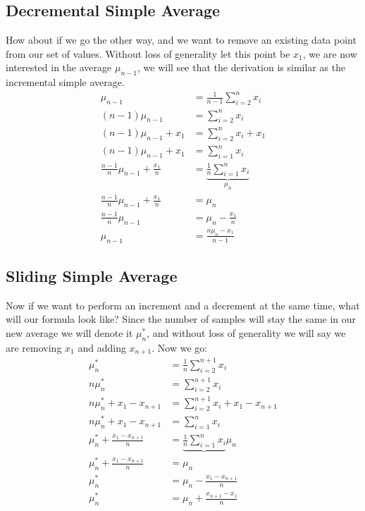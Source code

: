 \documentclass[english,12pt]{article}
\theoremstyle{plain}
\theoremstyle{definition}
\theoremstyle{definition} %
\begin{document}
\subsection{Decremental Simple Average}
How about if we go the other way, and we want to remove an existing data point from our set of values.  Without loss of generality let this point be $x_1$, we are now interested in the average $\mu_{n-1}$, we will see that the derivation is similar as the incremental simple average.  
\begin{align*}
\mu_{n-1} &= \frac{1}{n-1}\sum_{i=2}^{n}x_i\\
(n-1)\mu_{n-1} &= \sum_{i=2}^{n}x_i\\
(n-1)\mu_{n-1} + x_1 &= \sum_{i=2}^{n}x_i + x_1\\
(n-1)\mu_{n-1} + x_1 &= \sum_{i=1}^{n}x_i\\
\frac{n-1}{n}\mu_{n-1} + \frac{x_1}{n} &= \underbrace{\frac{1}{n}\sum_{i=1}^nx_i}_{\mu_n}\\
\frac{n-1}{n}\mu_{n-1} + \frac{x_1}{n} &= \mu_n\\
\frac{n-1}{n}\mu_{n-1} &= \mu_n - \frac{x_1}{n}\\
\mu_{n-1} &= \frac{n\mu_n - x_1}{n-1}
\end{align*}

\subsection{Sliding Simple Average}
Now if we want to perform an increment and a decrement at the same time, what will our formula look like?  Since the number of samples will stay the same in our new average we will denote it $\mu_{n}^\ast$, and without loss of generality we will say we are removing $x_1$ and adding $x_{n+1}$.  Now we go:
\begin{align*}
\mu_{n}^\ast &= \frac{1}{n} \sum_{i=2}^{n+1} x_i\\
n\mu_{n}^\ast &= \sum_{i=2}^{n+1} x_i\\
n\mu_{n}^\ast + x_1 - x_{n+1} &= \sum_{i=2}^{n+1} x_i + x_1 - x_{n+1}\\
n\mu_{n}^\ast + x_1 - x_{n+1} &= \sum_{i=1}^{n}x_i\\
\mu_{n}^\ast + \frac{x_1 - x_{n+1}}{n} &= \underbrace{\frac{1}{n}\sum_{i=1}^{n}x_i}{\mu_n}\\
\mu_{n}^\ast + \frac{x_1 - x_{n+1}}{n} &= \mu_n\\
\mu_{n}^\ast &= \mu_n - \frac{x_1 - x_{n+1}}{n}\\
\mu_{n}^\ast &= \mu_n + \frac{x_{n+1} - x_1}{n}\\
\end{align*}
\end{document}
